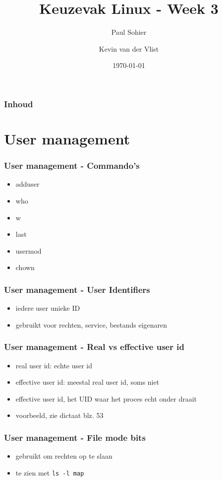 \documentclass{beamer}
\title{Keuzevak Linux - Week 3}
\author{Paul Sohier \and Kevin van der Vlist}
\institute{Versie $1.0$}
\date{\today}
\begin{document}
\begin{frame}
  \titlepage
\end{frame} 

\begin{frame}
  \frametitle{Inhoud}
  \tableofcontents
\end{frame}

\section{User management}
\begin{frame}
  \frametitle{User management - Commando's}
  \begin{itemize}
    \item<1-> adduser
    \item<2-> who
    \item<2-> w
    \item<3-> last
    \item<4-> usermod
    \item<5-> chown
  \end{itemize}
\end{frame}

\begin{frame}
  \frametitle{User management - User Identifiers}
  \begin{itemize}
    \item<1-> iedere user unieke ID
    \item<2-> gebruikt voor rechten, service, bestands eigenaren
  \end{itemize}
\end{frame}

\begin{frame}
  \frametitle{User management - Real vs effective user id}
  \begin{itemize}
    \item<1-> real user id: echte user id
    \item<2-> effective user id: meestal real user id, soms niet
    \item<3-> effective user id, het UID waar het proces echt onder draait
    \item<4-> voorbeeld, zie dictaat blz. 53
  \end{itemize}
\end{frame}

\begin{frame}
  \frametitle{User management - File mode bits}
  \begin{itemize}
    \item<1-> gebruikt om rechten op te slaan
    \item<2-> te zien met \texttt{ls -l map}
  \end{itemize}
\end{frame}
\end{document}
